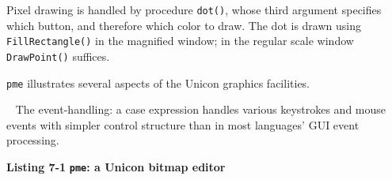 Pixel drawing is handled by procedure \texttt{dot()}, whose third
argument specifies which button, and therefore which color to draw.
The dot is drawn using \texttt{FillRectangle()} in the magnified window;
in the regular scale window \texttt{DrawPoint()} suffices.


\texttt{pme} illustrates several aspects of the Unicon graphics
facilities.

\medskip{}\ {\sffamily
The event-handling: a case expression handles various
keystrokes and mouse events with simpler control structure than in
most languages' GUI event processing.}\medskip

\bigskip

{\sffamily\bfseries Listing 7-1}
{\sffamily\bfseries \texttt{pme}: a Unicon bitmap editor}

